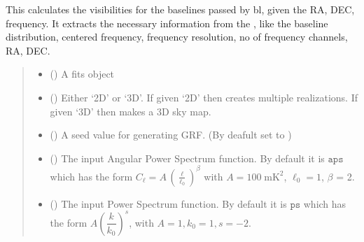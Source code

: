 \documentclass[a4paper,11pt,oneside,english,openany]{sphinxmanual}
\begin{document}
\begin{fulllineitems}
\label{\detokenize{simvis:simvis.sim_vis_hdul}}
\pysigstartsignatures
{}
\pysigstopsignatures
\sphinxAtStartPar
This calculates the visibilities for the baselines passed by bl, given the RA, DEC, frequency. It extracts the necessary information from the , like the baseline distribution, centered frequency, frequency resolution, no of frequency channels, RA, DEC.
\begin{quote}\begin{description}
\begin{itemize}
\item {} 
\sphinxAtStartPar
{} () \textendash{} A fits object

\item {} 
\sphinxAtStartPar
{} () \textendash{} Either ‘2D’ or ‘3D’. If given ‘2D’ then creates multiple realizations. If given ‘3D’ then makes a 3D sky map.

\item {} 
\sphinxAtStartPar
{} () \textendash{} A seed value for generating GRF. (By deafult set to )

\item {} 
\sphinxAtStartPar
{} () \textendash{} The input Angular Power Spectrum function. By default it is \(\texttt{aps}\) which has the form \(C_{\ell}=A\, \left(\frac{\ell}{\ell_0}\right)^{\beta}\) with \(A = 100\;\text{mK}^2\), \(\ell_0=1\), \(\beta\) = \sphinxhyphen{}2.

\item {} 
\sphinxAtStartPar
{} () \textendash{} The input Power Spectrum function. By default it is \(\texttt{ps}\) which has the form \(A \left(\dfrac{k}{k_0}\right)^{s}\), with \(A=1, k_0=1, s=-2\).


\end{itemize}
\end{description}
\end{quote}
\end{fulllineitems}
\end{document}

